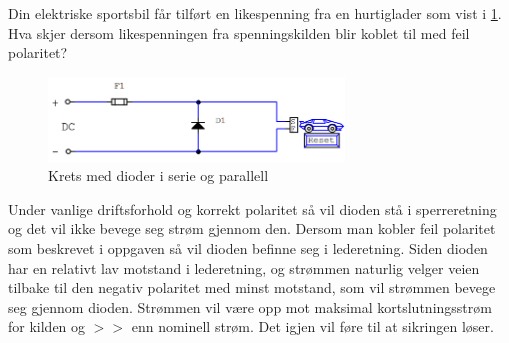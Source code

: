 \begin{question}[name=Spørsmål, topic=dioder]
Din elektriske sportsbil får tilført en likespenning fra en hurtiglader som vist i \ref{fig:diodeLading}. Hva skjer dersom likespenningen fra spenningskilden blir koblet til med feil polaritet?
	
	\begin{figure}[H]
		\centering
		\includegraphics[width=0.7\textwidth]{diode/figurer/DiodeLading.png}
		\caption{Krets med dioder i serie og parallell}
		\label{fig:diodeLading}
	\end{figure}
	
\end{question}


\begin{solution}[name=Løsningsforslag oppgave]
Under vanlige driftsforhold og korrekt polaritet så vil dioden stå i sperreretning og det vil ikke bevege seg strøm gjennom den. Dersom man kobler feil polaritet som beskrevet i oppgaven så vil dioden befinne seg i lederetning. Siden dioden har en relativt lav motstand i lederetning, og strømmen naturlig velger veien tilbake til den negativ polaritet med minst motstand, som vil strømmen bevege seg gjennom dioden. Strømmen vil være opp mot maksimal kortslutningsstrøm for kilden og $>>$ enn nominell strøm. Det igjen vil føre til at sikringen løser.
	
\end{solution}

